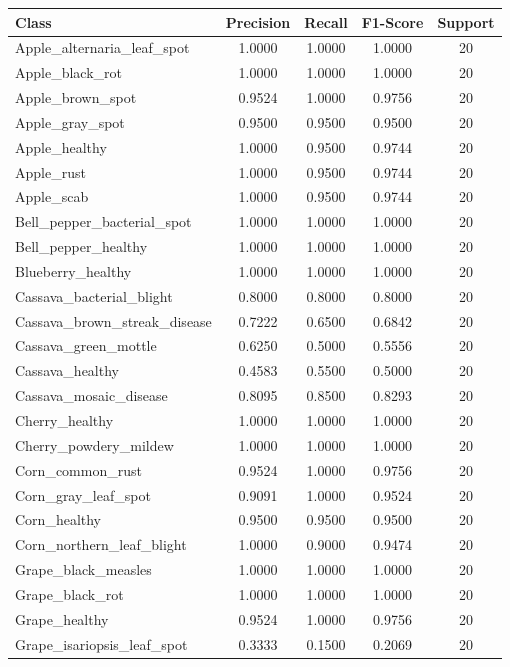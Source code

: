 \documentclass{article}
\begin{document}
\begin{center}
\begin{longtable}{lcccc}
\hline
\textbf{Class} & \textbf{Precision} & \textbf{Recall} & \textbf{F1-Score} & \textbf{Support} \\
\hline
\endhead
Apple\_alternaria\_leaf\_spot & 1.0000 & 1.0000 & 1.0000 & 20 \\
Apple\_black\_rot & 1.0000 & 1.0000 & 1.0000 & 20 \\
Apple\_brown\_spot & 0.9524 & 1.0000 & 0.9756 & 20 \\
Apple\_gray\_spot & 0.9500 & 0.9500 & 0.9500 & 20 \\
Apple\_healthy & 1.0000 & 0.9500 & 0.9744 & 20 \\
Apple\_rust & 1.0000 & 0.9500 & 0.9744 & 20 \\
Apple\_scab & 1.0000 & 0.9500 & 0.9744 & 20 \\
Bell\_pepper\_bacterial\_spot & 1.0000 & 1.0000 & 1.0000 & 20 \\
Bell\_pepper\_healthy & 1.0000 & 1.0000 & 1.0000 & 20 \\
Blueberry\_healthy & 1.0000 & 1.0000 & 1.0000 & 20 \\
Cassava\_bacterial\_blight & 0.8000 & 0.8000 & 0.8000 & 20 \\
Cassava\_brown\_streak\_disease & 0.7222 & 0.6500 & 0.6842 & 20 \\
Cassava\_green\_mottle & 0.6250 & 0.5000 & 0.5556 & 20 \\
Cassava\_healthy & 0.4583 & 0.5500 & 0.5000 & 20 \\
Cassava\_mosaic\_disease & 0.8095 & 0.8500 & 0.8293 & 20 \\
Cherry\_healthy & 1.0000 & 1.0000 & 1.0000 & 20 \\
Cherry\_powdery\_mildew & 1.0000 & 1.0000 & 1.0000 & 20 \\
Corn\_common\_rust & 0.9524 & 1.0000 & 0.9756 & 20 \\
Corn\_gray\_leaf\_spot & 0.9091 & 1.0000 & 0.9524 & 20 \\
Corn\_healthy & 0.9500 & 0.9500 & 0.9500 & 20 \\
Corn\_northern\_leaf\_blight & 1.0000 & 0.9000 & 0.9474 & 20 \\
Grape\_black\_measles & 1.0000 & 1.0000 & 1.0000 & 20 \\
Grape\_black\_rot & 1.0000 & 1.0000 & 1.0000 & 20 \\
Grape\_healthy & 0.9524 & 1.0000 & 0.9756 & 20 \\
Grape\_isariopsis\_leaf\_spot & 0.3333 & 0.1500 & 0.2069 & 20 \\

\end{longtable}
\end{center}
\end{document}
